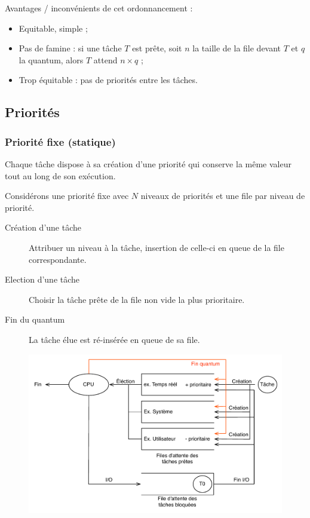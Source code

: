 \documentclass[11pt,english,french]{scrreprt}
\theoremstyle{remark}
\theoremstyle{definition}
\newcommand*\Pitem{%
  \item[\color{green}\scalebox{0.9}{\textbullet}]}
\newcommand*\Citem{%
  \item[\color{red}\scalebox{0.9}{\textbullet}]}
\begin{document}
Avantages / inconvénients de cet ordonnancement :\begin{itemize}
	\Pitem Equitable, simple ;
	\Pitem Pas de famine : si une tâche $T$ est prête, soit $n$ la taille de la file devant $T$ et $q$ la quantum, alors $T$ attend $n\times q$ ;
	\Citem Trop équitable : pas de priorités entre les tâches.
\end{itemize}

\subsection{Priorités} %
\subsubsection{Priorité fixe (statique)} %
Chaque tâche dispose à sa création d'une priorité qui conserve la même valeur tout au long de son exécution.

Considérons une priorité fixe avec $N$ niveaux de priorités et une file par niveau de priorité.

\begin{description}
	\item[Création d'une tâche] Attribuer un niveau à la tâche, insertion de celle-ci en queue de la file correspondante.
	\item[Election d'une tâche] Choisir la tâche prête de la file non vide la plus prioritaire.
	\item[Fin du quantum] La tâche élue est ré-insérée en queue de sa file.
\end{description}

\begin{figure}[h!]
	\center
	\vspace{-10pt}
	\includegraphics[scale=.65]{img/priorite-fixe}
	\vspace{-10pt}
\end{figure}
\end{document}
